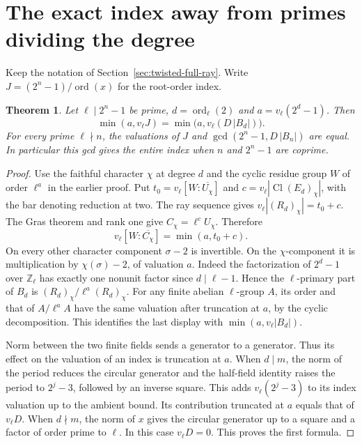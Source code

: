\documentclass[11pt]{article}
\newtheorem{theorem}{Theorem}
\newcommand{\ord}{\operatorname{ord}}
\begin{document}
\clearpage
\section{The exact index away from primes dividing the degree}
\label{sec:twisted-index-valuation}

Keep the notation of Section~\ref{sec:twisted-full-ray}. Write
\(J=(2^n-1)/\ord(x)\) for the root-order index.
\begin{theorem}
Let \(\ell\mid2^n-1\) be prime, \(d=\ord_\ell(2)\) and
\(a=v_\ell(2^d-1)\). Then
\[
        \min(a,v_\ell J)=\min\bigl(a,v_\ell(D\,|B_d|)\bigr).
\]
For every prime \(\ell\nmid n\), the valuations of \(J\) and
\(\gcd(2^n-1,D\,|B_n|)\) are equal. In particular this gcd gives
the entire index when \(n\) and \(2^n-1\) are coprime.
\end{theorem}
\begin{proof}
Use the faithful character \(\chi\) at degree \(d\) and the cyclic
residue group \(W\) of order \(\ell^a\) in the earlier proof.
Put \(t_0=v_\ell [W:\overline{U_\chi}]\) and
\(c=v_\ell|\operatorname{Cl}(E_d)_\chi|\), with the bar denoting
reduction at two. The ray sequence gives
\(v_\ell |(R_d)_\chi|=t_0+c\). The Gras theorem and rank one give
\(C_\chi=\ell^c U_\chi\). Therefore
\[
          v_\ell[W:\overline{C_\chi}]=\min(a,t_0+c).
\]
On every other character component \(\sigma-2\) is invertible.
On the \(\chi\)-component it is multiplication by
\(\chi(\sigma)-2\), of valuation \(a\). Indeed the factorization
of \(2^d-1\) over \(\mathbb Z_\ell\) has exactly one nonunit
factor since \(d\mid\ell-1\). Hence the \(\ell\)-primary part
of \(B_d\) is \((R_d)_\chi/\ell^a(R_d)_\chi\). For any finite
abelian \(\ell\)-group \(A\), its order and that of \(A/\ell^a A\)
have the same valuation after truncation at \(a\), by the cyclic
decomposition. This identifies the last display with
\(\min(a,v_\ell |B_d|)\).

Norm between the two finite fields sends a generator to a
generator. Thus its effect on the valuation of an index is
truncation at \(a\). When \(d\mid m\), the norm of the period
reduces the circular generator and the half-field identity raises
the period to \(2^j-3\), followed by an inverse square.
This adds \(v_\ell(2^j-3)\) to its index valuation up to the
ambient bound. Its contribution truncated at \(a\) equals that
of \(v_\ell D\). When \(d\nmid m\), the norm of \(x\) gives the
circular generator up to a square and a factor of order prime to
\(\ell\). In this case \(v_\ell D=0\). This proves the first formula.


\end{proof}
\end{document}
